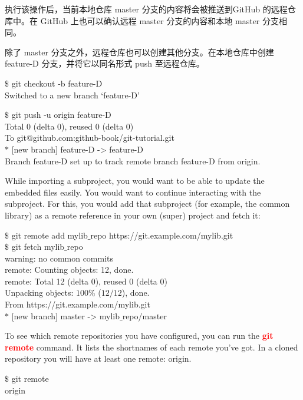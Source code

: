 \documentclass[12pt,a4paper]{article}
\begin{document}
执行该操作后，当前本地仓库 master 分支的内容将会被推送到GitHub 的远程仓库中。在 GitHub 上也可以确认远程 master 分支的内容和本地 master 分支相同。

除了 master 分支之外，远程仓库也可以创建其他分支。在本地仓库中创建 feature-D 分支，并将它以同名形式 push 至远程仓库。
\begin{tcolorbox}[colback=green!5,colframe=green!40!black,title= ]
$\$$ git checkout -b feature-D \\
Switched to a new branch `feature-D'
\end{tcolorbox}
\begin{tcolorbox}[colback=green!5,colframe=green!40!black,title= ]
$\$$ git push -u origin feature-D \\
Total 0 (delta 0), reused 0 (delta 0) \\
To git@github.com:github-book/git-tutorial.git \\
$\ast$ [new branch] feature-D -> feature-D \\
Branch feature-D set up to track remote branch feature-D from origin.
\end{tcolorbox}



\cite{narębski2016mastering} While importing a subproject, you would want to be able to update the embedded files easily. You would want to continue interacting with the subproject. For this, you would add that subproject (for example, the common library) as a remote reference in your own (super) project and fetch it:
\begin{tcolorbox}[colback=green!5,colframe=green!40!black,title= ]
$\$$ git remote add mylib$\_$repo https://git.example.com/mylib.git \\
$\$$ git fetch mylib$\_$repo \\
warning: no common commits \\
remote: Counting objects: 12, done. \\
remote: Total 12 (delta 0), reused 0 (delta 0) \\
Unpacking objects: $100\%$ ($12/12$), done. \\
From https://git.example.com/mylib.git \\
$\ast$ [new branch] master -> mylib$\_$repo/master \\
\end{tcolorbox}

To see which remote repositories you have configured, you can run the \textcolor{red}{\bf git remote} command. It lists the shortnames of each remote you've got. In a cloned repository you will have at least one remote: origin.
\begin{tcolorbox}[colback=green!5,colframe=green!40!black,title= ]
$\$$ git remote \\
origin
\end{tcolorbox}
\end{document}
